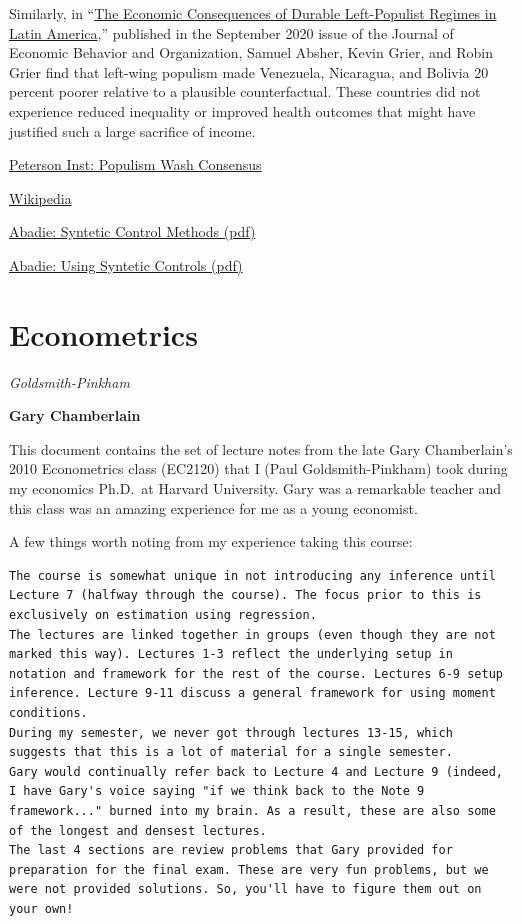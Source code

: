 \documentclass[
]{book}
\begin{document}
Similarly, in ``\href{https://www.sciencedirect.com/science/article/pii/S0167268120302237}{The Economic Consequences of Durable Left-Populist Regimes in Latin America},'' published in the September 2020 issue of the Journal of Economic Behavior and Organization, Samuel Absher, Kevin Grier, and Robin Grier find that left-wing populism made Venezuela, Nicaragua, and Bolivia 20 percent poorer relative to a plausible counterfactual. These countries did not experience reduced inequality or improved health outcomes that might have justified such a large sacrifice of income.

\href{https://www.piie.com/blogs/realtime-economic-issues-watch/washington-consensus-stands-test-time-better-populist-policies}{Peterson Inst: Populism Wash Consensus}

\href{https://en.wikipedia.org/wiki/Synthetic_control_method}{Wikipedia}

\href{pdf/Abadie_Synthetic_Control_Methods.pdf}{Abadie: Syntetic Control Methods (pdf)}

\href{pdf/Abadie_Using_Synthetic_Controls.pdf}{Abadie: Using Syntetic Controls (pdf)}

\hypertarget{econometrics}{%
\chapter{Econometrics}\label{econometrics}}

\emph{Goldsmith-Pinkham}

\textbf{Gary Chamberlain}

This document contains the set of lecture notes from the late Gary Chamberlain's 2010 Econometrics class (EC2120) that I (Paul Goldsmith-Pinkham) took during my economics Ph.D.~at Harvard University. Gary was a remarkable teacher and this class was an amazing experience for me as a young economist.

A few things worth noting from my experience taking this course:

\begin{verbatim}
The course is somewhat unique in not introducing any inference until Lecture 7 (halfway through the course). The focus prior to this is exclusively on estimation using regression.
The lectures are linked together in groups (even though they are not marked this way). Lectures 1-3 reflect the underlying setup in notation and framework for the rest of the course. Lectures 6-9 setup inference. Lecture 9-11 discuss a general framework for using moment conditions.
During my semester, we never got through lectures 13-15, which suggests that this is a lot of material for a single semester.
Gary would continually refer back to Lecture 4 and Lecture 9 (indeed, I have Gary's voice saying "if we think back to the Note 9 framework..." burned into my brain. As a result, these are also some of the longest and densest lectures.
The last 4 sections are review problems that Gary provided for preparation for the final exam. These are very fun problems, but we were not provided solutions. So, you'll have to figure them out on your own!
\end{verbatim}
\end{document}
